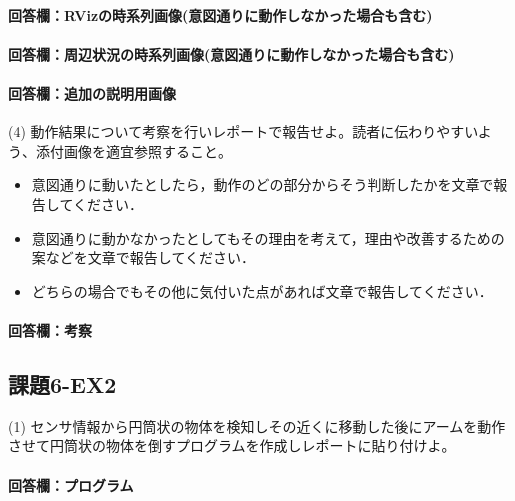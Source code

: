 \documentclass[12pt, xelatex,ja=standard,jafont=noto]{bxjsarticle}
\newif\ifdraft
\begin{document}
\paragraph{回答欄：RVizの時系列画像(意図通りに動作しなかった場合も含む)}
\ifdraft
RVizの時系列画像を貼り付ける
\fi

\paragraph{回答欄：周辺状況の時系列画像(意図通りに動作しなかった場合も含む)}
\ifdraft
周辺状況の時系列画像を貼り付ける
\fi

\paragraph{回答欄：追加の説明用画像}
\ifdraft
説明に必要な追加画像があれば貼り付ける
\fi

\begin{itembox}[l]{(4)}
動作結果について考察を行いレポートで報告せよ。読者に伝わりやすいよう、添付画像を適宜参照すること。
\begin{itemize}
    \item 意図通りに動いたとしたら，動作のどの部分からそう判断したかを文章で報告してください．
    \item 意図通りに動かなかったとしてもその理由を考えて，理由や改善するための案などを文章で報告してください．
    \item どちらの場合でもその他に気付いた点があれば文章で報告してください．
\end{itemize}
\end{itembox}

\paragraph{回答欄：考察}
\ifdraft
詳しい考察を記載する。
\fi


\subsection{課題6-EX2}
\begin{itembox}[l]{(1)}
センサ情報から円筒状の物体を検知しその近くに移動した後にアームを動作させて円筒状の物体を倒すプログラムを作成しレポートに貼り付けよ。
\end{itembox}

\paragraph{回答欄：プログラム}
\ifdraft
センサ情報から円筒状の物体を検知しその近くに移動し、その物体を倒すプログラムをリスト\ref{lst:movetocylinder2}に示す…
\begin{lstlisting}[caption=コード,label=lst:movetocylinder2]
...
\end{lstlisting}
\fi
\end{document}
